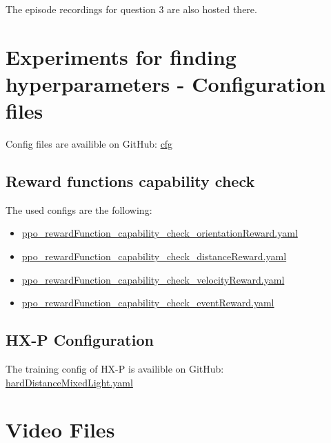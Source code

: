 The episode recordings for question 3 are also hosted there.

\section{Experiments for finding hyperparameters - Configuration files}
\label{cha:experiment_configs}

Config files are availible on GitHub: \href{https://github.com/geschnee/carsim-rl-cnn/tree/main/python/cfg}{cfg}

\subsection{Reward functions capability check}
The used configs are the following:
\begin{itemize}
    \item \href{https://github.com/geschnee/carsim-rl-cnn/tree/main/python/cfg/ppo_rewardFunction_capability_check_orientationReward.yaml}{ppo\_rewardFunction\_capability\_check\_orientationReward.yaml}
    \item \href{https://github.com/geschnee/carsim-rl-cnn/tree/main/python/cfg/ppo_rewardFunction_capability_check_distanceReward.yaml}{ppo\_rewardFunction\_capability\_check\_distanceReward.yaml}
    \item \href{https://github.com/geschnee/carsim-rl-cnn/tree/main/python/cfg/ppo_rewardFunction_capability_check_velocityReward.yaml}{ppo\_rewardFunction\_capability\_check\_velocityReward.yaml}
    \item \href{https://github.com/geschnee/carsim-rl-cnn/tree/main/python/cfg/ppo_rewardFunction_capability_check_eventReward.yaml}{ppo\_rewardFunction\_capability\_check\_eventReward.yaml}
\end{itemize}


\subsection{\ac{HX-P} Configuration}
\label{cha:most_successful_config}

The training config of \ac{HX-P} is availible on GitHub:
\href{https://github.com/geschnee/carsim-rl-cnn/tree/main/python/cfg/hardDistanceMixedLight.yaml}{hardDistanceMixedLight.yaml}

\section{Video Files}
\label{cha:example_videos}


